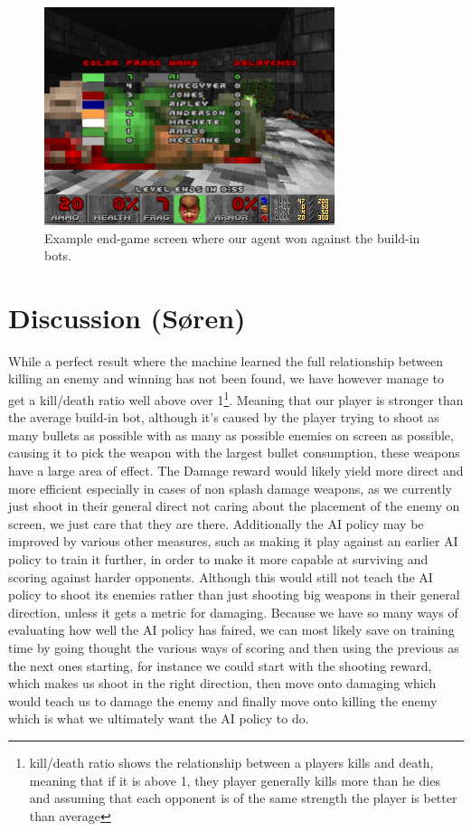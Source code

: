 \documentclass{article}
\begin{document}
\begin{figure}[htb]

\begin{minipage}[b]{1.0\linewidth}
  \centering
  \centerline{\includegraphics[width=8.5cm]{result}}
\end{minipage}
\caption{Example end-game screen where our agent won against the build-in bots.}
\label{fig:res}
%
\end{figure}
\newpage
\section{Discussion (Søren)}
While a perfect result where the machine learned the full relationship between killing an enemy and winning has not been found, we have however manage to get a kill/death ratio well above over 1\footnote{kill/death ratio shows the relationship between a players kills and death, meaning that if it is above 1, they player generally kills more than he dies and assuming that each opponent is of the same strength the player is better than average}. Meaning that our player is stronger than the average build-in bot, although it's caused by the player trying to shoot as many bullets as possible with as many as possible enemies on screen as possible, causing it to pick the weapon with the largest bullet consumption, these weapons have a large area of effect.
The Damage reward would likely yield more direct and more efficient especially in cases of non splash damage weapons, as we currently just shoot in their general direct not caring about the placement of the enemy on screen, we just care that they are there. Additionally the AI policy may be improved by various other measures, such as making it play against an earlier AI policy to train it further, in order to make it more capable at surviving and scoring against harder opponents. Although this would still not teach the AI policy to shoot its enemies rather than just shooting big weapons in their general direction, unless it gets a metric for damaging. Because we have so many ways of evaluating how well the AI policy has faired, we can most likely save on training time by going thought the various ways of scoring and then using the previous as the next ones starting, for instance we could start with the shooting reward, which makes us shoot in the right direction, then move onto damaging which would teach us to damage the enemy and finally move onto killing the enemy which is what we ultimately want the AI policy to do. 
\end{document}
